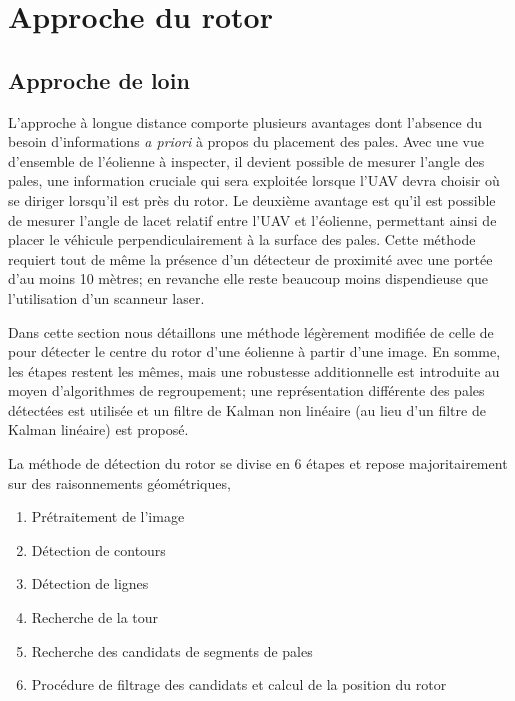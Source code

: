\section{Approche du rotor}

\subsection{Approche de loin}
\label{subsec:approche_loin}

L'approche à longue distance comporte plusieurs avantages dont l'absence du besoin d'informations \textit{a priori} à propos du placement des pales. Avec une vue d'ensemble de l'éolienne à inspecter, il devient possible de mesurer l'angle des pales, une information cruciale qui sera exploitée lorsque l'UAV devra choisir où se diriger lorsqu'il est près du rotor. Le deuxième avantage est qu'il est possible de mesurer l'angle de lacet relatif entre l'UAV et l'éolienne, permettant ainsi de placer le véhicule perpendiculairement à la surface des pales. Cette méthode requiert tout de même la présence d'un détecteur de proximité avec une portée d'au moins 10 mètres; en revanche elle reste beaucoup moins dispendieuse que l'utilisation d'un scanneur laser.

Dans cette section nous détaillons une méthode légèrement modifiée de celle de \citep{Stokkeland2015} pour détecter le centre du rotor d'une éolienne à partir d'une image. En somme, les étapes restent les mêmes, mais une robustesse additionnelle est introduite au moyen d'algorithmes de regroupement; une représentation différente des pales détectées est utilisée et un filtre de Kalman non linéaire (au lieu d'un filtre de Kalman linéaire) est proposé.

La méthode de détection du rotor se divise en 6 étapes et repose majoritairement sur des raisonnements géométriques,

\begin{enumerate}
  \item Prétraitement de l'image
  \item Détection de contours
  \item Détection de lignes
  \item Recherche de la tour
  \item Recherche des candidats de segments de pales
  \item Procédure de filtrage des candidats et calcul de la position du rotor
\end{enumerate}

